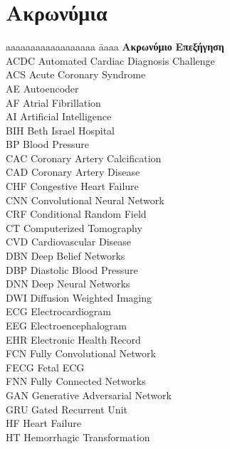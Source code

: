 \chapter*{Ακρωνύμια}
\label{sec:acronyms}


\begin{tabbing}
	aaaaaaaaaaaaaaaaaa \= aaaa\kill
	\Large\textbf{Ακρωνύμιο} \> \Large\textbf{Επεξήγηση} \\
	ACDC \> Automated Cardiac Diagnosis Challenge \\
	ACS \> Acute Coronary Syndrome \\
	AE \> Autoencoder \\
	AF \> Atrial Fibrillation \\
	AI \> Artificial Intelligence \\
	BIH \> Beth Israel Hospital \\
	BP \> Blood Pressure \\
	CAC \> Coronary Artery Calcification \\
	CAD \> Coronary Artery Disease \\
	CHF \> Congestive Heart Failure \\
	CNN \> Convolutional Neural Network \\
	CRF \> Conditional Random Field \\
	CT \> Computerized Tomography \\
	CVD \> Cardiovascular Disease \\
	DBN \> Deep Belief Networks \\
	DBP \> Diastolic Blood Pressure \\
	DNN \> Deep Neural Networks \\
	DWI \> Diffusion Weighted Imaging \\
	ECG \> Electrocardiogram \\
	EEG \> Electroencephalogram \\
	EHR \> Electronic Health Record \\
	FCN \> Fully Convolutional Network \\
	FECG \> Fetal ECG \\
	FNN \> Fully Connected Networks \\
	GAN \> Generative Adversarial Network \\
	GRU \> Gated Recurrent Unit \\
	HF \> Heart Failure \\
	HT \> Hemorrhagic Transformation \\

\end{tabbing}
